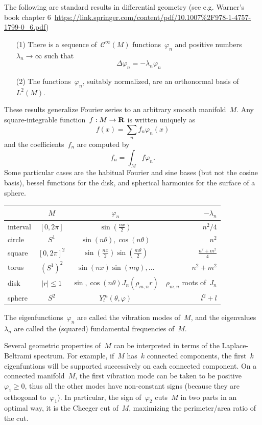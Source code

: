 The following are standard results in differential geometry (see e.g.
Warner's book chapter
6~\url{https://link.springer.com/content/pdf/10.1007\%2F978-1-4757-1799-0_6.pdf})

\begin{itemize}
	\item[(1)] There is a sequence of~$\mathcal{C}^\infty(M)$
		functions~$\varphi_n$ and positive
		numbers~$\lambda_n\to\infty$ such that
		$$\Delta\varphi_n=-\lambda_n\varphi_n$$
	\item[(2)] The functions~$\varphi_n$, suitably normalized, are an
		orthonormal basis of~$L^2(M)$.
\end{itemize}

These results generalize Fourier series to an arbitrary smooth manifold~$M$.
Any square-integrable function~$f:M\to\mathbf{R}$ is written uniquely as
$$f(x)=\sum_nf_n\varphi_n(x)$$ and the coefficients~$f_n$ are computed by
$$f_n=\int_Mf\varphi_n.$$  Some particular cases are the habitual Fourier and
sine bases (but not the cosine basis), bessel functions for the disk, and
spherical harmonics for the surface of a sphere.

\begin{tabular}{lccr}
	&$M$ & $\varphi_n$ & $-\lambda_n$ \\
	\hline
	interval & $[0,2\pi]$ & $\sin\left(\frac{nx}{2}\right)$ & $n^2/4$ \\
	circle & $S^1$ & $\sin(n\theta),\cos(n\theta)$ & $n^2$ \\
	square & $[0,2\pi]^2$ &
	$\sin\left(\frac{nx}{2}\right)\sin\left(\frac{m\theta}{2}\right)$ &
	$\frac{n^2+m^2}{4}$ \\
	torus & $(S^1)^2$ & $\sin(nx)\sin(my),\ldots$ & $n^2+m^2$ \\
	disk & $|r|\le1$ & $\sin,\cos(n\theta)J_n(\rho_{m,n}r)$ &
	$\rho_{m,n}$ roots of~$J_n$ \\
	sphere & $S^2$ & $Y^m_l(\theta,\varphi)$ & $l^2+l$
\end{tabular}

The eigenfunctions~$\varphi_n$ are called the vibration modes of~$M$, and the
eigenvalues~$\lambda_n$ are called the (squared) fundamental frequencies of~$M$.

Several geometric properties of~$M$ can be interpreted in terms of the
Laplace-Beltrami spectrum.  For example, if~$M$ has~$k$ connected components,
the first~$k$ eigenfuntions will be supported successively on each connected
component.  On a connected manifold~$M$, the first vibration mode can be
taken to be positive~$\varphi_1\ge0$, thus all the other modes have
non-constant signs (because they are orthogonal to~$\varphi_1$).  In
particular, the sign of~$\varphi_2$ cuts~$M$ in two parts in an optimal way,
it is the Cheeger cut of~$M$, maximizing the perimeter/area ratio of the cut.

